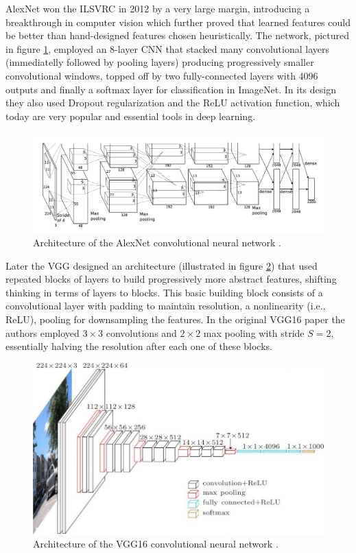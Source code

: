 AlexNet \cite{alexnet} won the \ac{ILSVRC} \cite{imagenet} in 2012 by a very large margin, introducing a breakthrough in computer vision which further proved that learned features could be better than hand-designed features chosen heuristically. The network, pictured in figure \ref{fig:alexnet}, employed an 8-layer \ac{CNN} that stacked many convolutional layers (immediatelly followed by pooling layers) producing progressively smaller convolutional windows, topped off by two fully-connected layers with 4096 outputs and finally a softmax layer for classification in ImageNet. In its design they also used Dropout regularization and the ReLU activation function, which today are very popular and essential tools in deep learning.

\begin{figure}[ht]
    \centering
    \includegraphics[width=1.0\textwidth]{figs/alexnet.png}
    \caption{Architecture of the AlexNet convolutional neural network \cite{alexnet}.}
    \label{fig:alexnet}
\end{figure}

Later the \ac{VGG} designed an architecture (illustrated in figure \ref{fig:vgg16}) that used repeated blocks of layers to build progressively more abstract features, shifting thinking in terms of layers to blocks. This basic building block consists of a convolutional layer with padding to maintain resolution, a nonlinearity (i.e., ReLU), pooling for downsampling the features. In the original VGG16 paper \cite{vgg16} the authors employed $3 \times 3$ convolutions and $2 \times 2$ max pooling with stride $S = 2$, essentially halving the resolution after each one of these blocks.

\begin{figure}[ht]
    \centering
    \includegraphics[width=1.0\textwidth]{figs/vgg16.jpg}
    \caption{Architecture of the VGG16 convolutional neural network \cite{vgg16}.}
    \label{fig:vgg16}
\end{figure}

